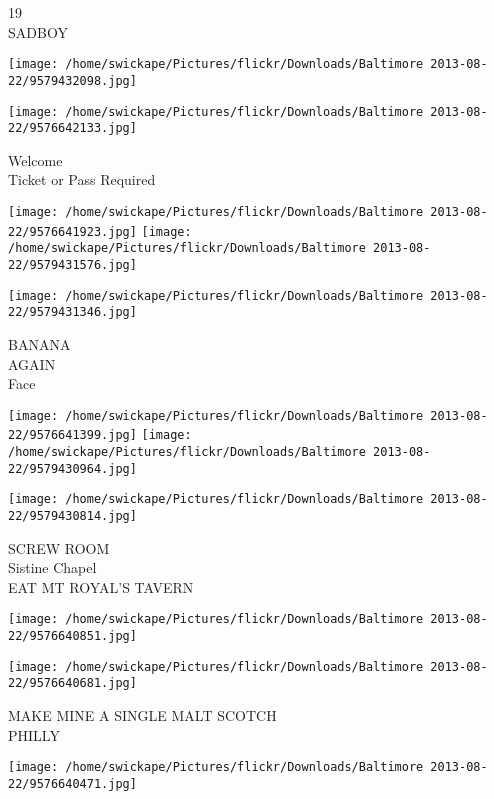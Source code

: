 \documentclass[10pt,letterpaper]{article}
\begin{document}
19\\
SADBOY\\
\pagebreak

\texttt{[image: /home/swickape/Pictures/flickr/Downloads/Baltimore 2013-08-22/9579432098.jpg]}

\vspace{0.25in}
\texttt{[image: /home/swickape/Pictures/flickr/Downloads/Baltimore 2013-08-22/9576642133.jpg]}

Welcome\\
Ticket or Pass Required\\
\pagebreak

\texttt{[image: /home/swickape/Pictures/flickr/Downloads/Baltimore 2013-08-22/9576641923.jpg]}
\texttt{[image: /home/swickape/Pictures/flickr/Downloads/Baltimore 2013-08-22/9579431576.jpg]}

\vspace{0.25in}
\texttt{[image: /home/swickape/Pictures/flickr/Downloads/Baltimore 2013-08-22/9579431346.jpg]}

BANANA\\
AGAIN\\
Face\\
\pagebreak

\texttt{[image: /home/swickape/Pictures/flickr/Downloads/Baltimore 2013-08-22/9576641399.jpg]}
\texttt{[image: /home/swickape/Pictures/flickr/Downloads/Baltimore 2013-08-22/9579430964.jpg]}

\vspace{0.25in}
\texttt{[image: /home/swickape/Pictures/flickr/Downloads/Baltimore 2013-08-22/9579430814.jpg]}

SCREW ROOM\\
Sistine Chapel\\
EAT MT ROYAL'S TAVERN\\
\pagebreak

\texttt{[image: /home/swickape/Pictures/flickr/Downloads/Baltimore 2013-08-22/9576640851.jpg]}

\vspace{0.25in}
\texttt{[image: /home/swickape/Pictures/flickr/Downloads/Baltimore 2013-08-22/9576640681.jpg]}

MAKE MINE A SINGLE MALT SCOTCH\\
PHILLY\\
\pagebreak

\texttt{[image: /home/swickape/Pictures/flickr/Downloads/Baltimore 2013-08-22/9576640471.jpg]}
\end{document}
